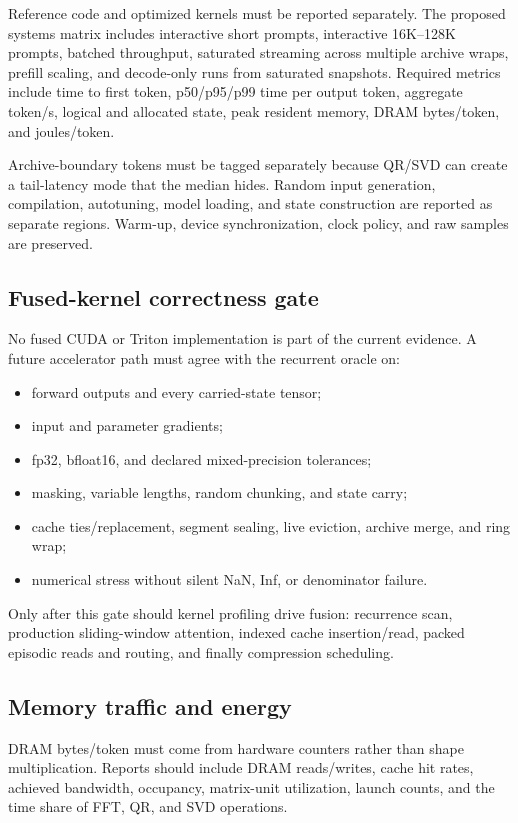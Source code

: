 Reference code and optimized kernels must be reported separately. The proposed
systems matrix includes interactive short prompts, interactive 16K--128K
prompts, batched throughput, saturated streaming across multiple archive
wraps, prefill scaling, and decode-only runs from saturated snapshots.
Required metrics include time to first token, p50/p95/p99 time per output
token, aggregate token/s, logical and allocated state, peak resident memory,
DRAM bytes/token, and joules/token.

Archive-boundary tokens must be tagged separately because QR/SVD can create a
tail-latency mode that the median hides. Random input generation, compilation,
autotuning, model loading, and state construction are reported as separate
regions. Warm-up, device synchronization, clock policy, and raw samples are
preserved.

\subsection{Fused-kernel correctness gate}

No fused CUDA or Triton implementation is part of the current evidence. A
future accelerator path must agree with the recurrent oracle on:

\begin{itemize}
  \item forward outputs and every carried-state tensor;
  \item input and parameter gradients;
  \item fp32, bfloat16, and declared mixed-precision tolerances;
  \item masking, variable lengths, random chunking, and state carry;
  \item cache ties/replacement, segment sealing, live eviction, archive merge,
  and ring wrap;
  \item numerical stress without silent NaN, Inf, or denominator failure.
\end{itemize}

Only after this gate should kernel profiling drive fusion: recurrence scan,
production sliding-window attention, indexed cache insertion/read, packed
episodic reads and routing, and finally compression scheduling.

\subsection{Memory traffic and energy}

DRAM bytes/token must come from hardware counters rather than shape
multiplication. Reports should include DRAM reads/writes, cache hit rates,
achieved bandwidth, occupancy, matrix-unit utilization, launch counts, and the
time share of FFT, QR, and SVD operations.

